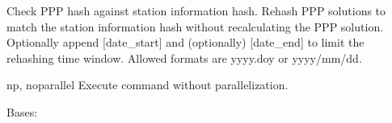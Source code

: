 \documentclass[letterpaper,10pt,english]{sphinxmanual}
\begin{document}
\begin{description}
\begin{description}
\sphinxAtStartPar
Check PPP hash against station information hash.
Rehash PPP solutions to match the station information
hash without recalculating the PPP solution.
Optionally append {[}date\_start{]} and (optionally)
{[}date\_end{]} to limit the rehashing time window. Allowed
formats are yyyy.doy or yyyy/mm/dd.

\end{description}
\begin{optionlist}{3cm}
\item [\sphinxhyphen{}np, \sphinxhyphen{}\sphinxhyphen{}noparallel]  
\sphinxAtStartPar
Execute command without parallelization.
\end{optionlist}

\end{description}

\begin{fulllineitems}
\label{\detokenize{com:com.ScanArchive.Encoder}}
\pysigstartsignatures
{}
\pysigstopsignatures
\sphinxAtStartPar
Bases: 

\begin{fulllineitems}
\label{\detokenize{com:com.ScanArchive.Encoder.default}}
\pysigstartsignatures
{}
\pysigstopsignatures
\end{fulllineitems}


\end{fulllineitems}
\end{document}
